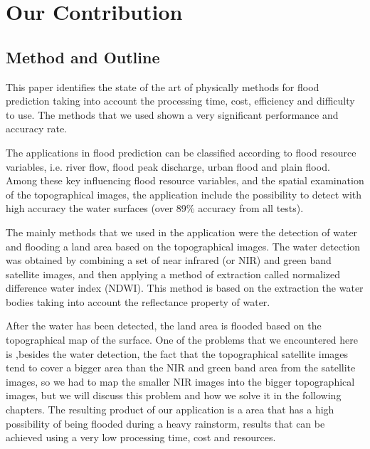 \documentclass[12pt, a4paper]{report}
\begin{document}
\section{Our Contribution}
\subsection{Method and Outline}

\quad
This paper identifies the state of the art of physically methods for flood prediction taking into account the processing time, cost, efficiency and difficulty to use. The methods that we used shown a very significant performance and accuracy rate.
\par

The applications in flood prediction can be classified according to flood resource variables, i.e. river flow, flood peak discharge, urban flood and plain flood. Among these key influencing flood resource variables, and the spatial examination of the topographical images, the application include the possibility to detect with high accuracy the water surfaces (over 89\% accuracy from all tests).
\par

The mainly methods that we used in the application were the detection of water and flooding a land area based on the topographical images. The water detection was obtained by combining a set of near infrared (or NIR) and green band satellite images, and then applying a method of extraction called normalized difference water index (NDWI). This method is based on the extraction the water bodies taking into account the reflectance property of water.
\par 

After the water has been detected, the land area is flooded based on the topographical map of the surface. One of the problems that we encountered here is ,besides the water detection, the fact that the topographical satellite images tend to cover a bigger area than the NIR and green band area from the satellite images, so we had to map the smaller NIR images into the bigger topographical images, but we will discuss this problem and how we solve it in the following chapters. The resulting product of our application is a area that has a high possibility of being flooded during a heavy rainstorm, results that can be achieved using a very low processing time, cost and resources.
\par 
\end{document}
